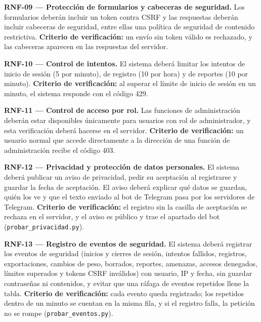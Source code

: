 \documentclass[journal,onecolumn,12pt,draftclsnofoot]{IEEEtran}
\begin{document}
\par\medskip\noindent\textbf{RNF-09 --- Protección de formularios y cabeceras de seguridad.} Los formularios deberán incluir un token contra CSRF y las respuestas deberán incluir cabeceras de seguridad, entre ellas una política de seguridad de contenido restrictiva. \textbf{Criterio de verificación:} un envío sin token válido es rechazado, y las cabeceras aparecen en las respuestas del servidor.

\par\medskip\noindent\textbf{RNF-10 --- Control de intentos.} El sistema deberá limitar los intentos de inicio de sesión (5 por minuto), de registro (10 por hora) y de reportes (10 por minuto). \textbf{Criterio de verificación:} al superar el límite de inicio de sesión en un minuto, el sistema responde con el código 429.

\par\medskip\noindent\textbf{RNF-11 --- Control de acceso por rol.} Las funciones de administración deberán estar disponibles únicamente para usuarios con rol de administrador, y esta verificación deberá hacerse en el servidor. \textbf{Criterio de verificación:} un usuario normal que accede directamente a la dirección de una función de administración recibe el código 403.

\par\medskip\noindent\textbf{RNF-12 --- Privacidad y protección de datos personales.} El sistema deberá publicar un aviso de privacidad, pedir su aceptación al registrarse y guardar la fecha de aceptación. El aviso deberá explicar qué datos se guardan, quién los ve y que el texto enviado al bot de Telegram pasa por los servidores de Telegram. \textbf{Criterio de verificación:} el registro sin la casilla de aceptación se rechaza en el servidor, y el aviso es público y trae el apartado del bot (\texttt{probar\_privacidad.py}).

\par\medskip\noindent\textbf{RNF-13 --- Registro de eventos de seguridad.} El sistema deberá registrar los eventos de seguridad (inicios y cierres de sesión, intentos fallidos, registros, exportaciones, cambios de peso, borrados, reportes, amenazas, accesos denegados, límites superados y tokens CSRF inválidos) con usuario, IP y fecha, sin guardar contraseñas ni contenidos, y evitar que una ráfaga de eventos repetidos llene la tabla. \textbf{Criterio de verificación:} cada evento queda registrado; los repetidos dentro de un minuto se cuentan en la misma fila, y si el registro falla, la petición no se rompe (\texttt{probar\_eventos.py}).
\end{document}
